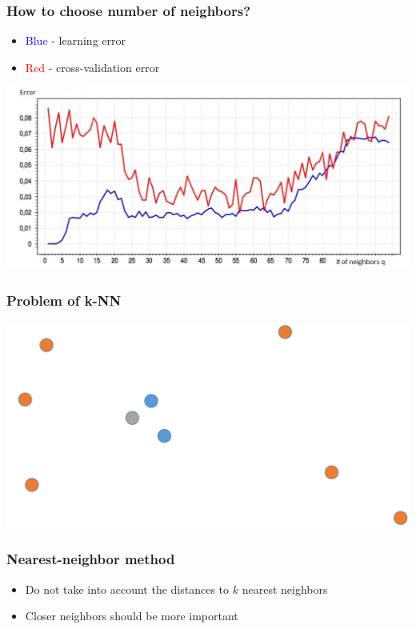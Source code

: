 \documentclass[default]{beamer}
\begin{document}
	\begin{frame}
		\frametitle{How to choose number of neighbors?}
		\begin{itemize}
			\item \textcolor{blue}{Blue} - learning error
			\item \textcolor{red}{Red} - cross-validation error
		\end{itemize}
		\centering
		\includegraphics[width=\textwidth]{linear_3.jpg}
	\end{frame}

	\begin{frame}
		\frametitle{Problem of k-NN}
		
		\centering
		\includegraphics[width=\textwidth]{linear_4.png}
	\end{frame}

	\begin{frame}
		\frametitle{Nearest-neighbor method}
		\Large
		\begin{itemize}
			\item Do not take into account the distances to $k$ nearest neighbors
			\item Closer neighbors should be more important
		\end{itemize}
	\end{frame}
\end{document}
